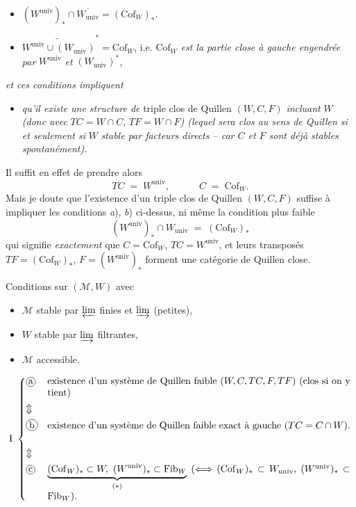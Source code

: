 \documentclass[11pt]{article}
\newcommand{\printedpage}[1]{\marginpar{\footnotesize p.~#1}}
\newcommand{\msp}[1]{\marginpar{\footnotesize [#1]}}
\newcommand{\Cof}{\mathrm{Cof}}
\newcommand{\Fib}{\mathrm{Fib}}
\newcommand{\univ}{\mathrm{univ}}
\newcommand{\cercle}[1]{\mbox{\tikz[baseline=(c.base)]\node[draw,circle,inner sep=1pt](c){#1};}}
\begin{document}
\msp{page 25}
\begin{itemize}[leftmargin=3em]
\item[\cercle{a}] $(W^{\univ})_* \cap \overline{W_{\univ}} = (\Cof_W)_*$.

\item[\cercle{b}] $\widetilde{W^{\univ} \cup (W_{\univ})}^{*} = \Cof_W$, i.e. $\Cof_W$ \textit{est la partie close à gauche engendrée par} $W^{\univ}$ \textit{et} $(W_{\univ})^*$\textit{,} %
\end{itemize}

\noindent\textit{et ces conditions impliquent}

\begin{itemize}[leftmargin=3em]
\item[\cercle{c}] \textit{qu'il existe une structure de} triple clos de Quillen $(W, C, F)$ \textit{incluant} $W$ \textit{(donc avec} $TC = W \cap C$, $TF = W \cap F$\textit{) (lequel sera clos au sens de Quillen si et seulement si} $W$ \textit{stable par facteurs directs -- car $C$ et $F$ sont déjà stables spontanément).}
\end{itemize}

\noindent Il suffit en effet de prendre alors
\[
TC \;=\; W^{\univ}, \qquad\quad C \;=\; \Cof_W .
\]
Mais je doute que l'existence d'un triple clos de Quillen $(W, C, F)$ suffise à impliquer les conditions \textit{a}), \textit{b}) ci-dessus, ni même la condition plus faible
\[
(W^{\univ})_* \cap W_{\univ} \;=\; (\Cof_W)_*
\]
qui signifie \textit{exactement} que $C = \Cof_W$, $TC = W^{\univ}$, et leurs transposés $TF = (\Cof_W)_*$, $F = (W^{\univ})_*$ forment une catégorie de Quillen close.

\clearpage
\printedpage{15}

\msp{page 26}
\noindent Conditions sur $(\mathcal{M}, W)$ avec
\begin{itemize}[leftmargin=3em]
\item[\textit{a})] $\mathcal{M}$ stable par $\varprojlim$ finies et $\varinjlim$ (petites),
\item[\textit{b})] $W$ stable par $\varinjlim$ filtrantes,
\item[\textit{c})] $\mathcal{M}$ accessible.
\end{itemize}

\[
\mathrm{I}\ \left\{
\begin{array}{@{}l@{\quad}p{11cm}@{}}
\cercle{a} & existence d'un système de Quillen faible $(W, C, TC, F, TF)$ (clos si on y tient) \\[1ex]
\Updownarrow & \\[1ex]
\cercle{b} & existence d'un système de Quillen faible exact à gauche ($TC = C \cap W$). \\[1ex]
\Updownarrow & \\[1ex]
\cercle{c} & $\underbrace{(\Cof_W)_* \subset W,\ (W^{\univ})_* \subset \Fib_W}_{(*)}$ ($\Longleftrightarrow$ $(\Cof_W)_* \subset W_{\univ}$, $(W^{\univ})_* \subset \Fib_W$).
\end{array}\right.
\]
\end{document}
